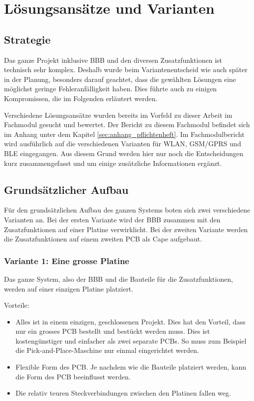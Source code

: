 \chapter{Lösungsansätze und Varianten}


\section{Strategie}
Das ganze Projekt inklusive BBB und den diversen Zusatzfunktionen ist technisch sehr komplex. Deshalb wurde beim Variantenentscheid wie auch später in der Planung, besonders darauf geachtet, dass die gewählten Lösungen eine möglichst geringe Fehleranfälligkeit haben. Dies führte auch zu einigen Kompromissen, die im Folgenden erläutert werden.


Verschiedene Lösungsansätze wurden bereits im Vorfeld zu dieser Arbeit im Fachmodul gesucht und bewertet. Der Bericht zu diesem Fachmodul befindet sich im Anhang unter dem Kapitel \ref{sec:anhang_pflichtenheft}. Im Fachmodulbericht wird ausführlich auf die verschiedenen Varianten für WLAN, GSM/GPRS und BLE eingegangen. Aus diesem Grund werden hier nur noch die Entscheidungen kurz zusammengefasst und um einige zusätzliche Informationen ergänzt.



\section{Grundsätzlicher Aufbau}
Für den grundsätzlichen Aufbau des ganzen Systems boten sich zwei verschiedene Varianten an. Bei der ersten Variante wird der BBB zusammen mit den Zusatzfunktionen auf einer Platine verwirklicht. Bei der zweiten Variante werden die Zusatzfunktionen auf einem zweiten PCB als Cape aufgebaut.

\subsection{Variante 1: Eine grosse Platine}
Das ganze System, also der BBB und die Bauteile für die Zusatzfunktionen, werden auf einer einzigen Platine platziert.

Vorteile:
\begin{itemize}
\item Alles ist in einem einzigen, geschlossenen Projekt. Dies hat den Vorteil, dass nur ein grosses PCB bestellt und bestückt werden muss. Dies ist kostengünstiger und einfacher als zwei separate PCBs. So muss zum Beispiel die Pick-and-Place-Maschine nur einmal eingerichtet werden.
\item Flexible Form des PCB. Je nachdem wie die Bauteile platziert werden, kann die Form des PCB beeinflusst werden.
\item Die relativ teuren Steckverbindungen zwischen den Platinen fallen weg.
\end{itemize}

